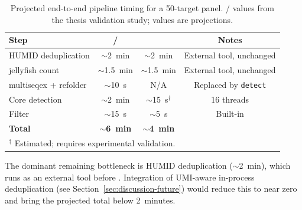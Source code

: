\begin{table}[h]
  \centering
  \caption{Projected end-to-end pipeline timing for a 50-target panel.
    \km{}/\kmtools{} values from the thesis validation study;
    \kmerdet{} values are projections. }
  \label{tab:e2e-timing}
  \begin{tabular}{lccc}
    \toprule
    Step & \km{}/\kmtools{} & \kmerdet{} & Notes \\
    \midrule
    HUMID deduplication & $\sim$2~min & $\sim$2~min & External tool, unchanged \\
    jellyfish count & $\sim$1.5~min & $\sim$1.5~min & External tool, unchanged \\
    multiseqex + refolder & $\sim$10~s & N/A & Replaced by \texttt{detect} \\
    Core detection & $\sim$2~min & $\sim$15~s$^\dagger$ & 16 threads \\
    Filter & $\sim$15~s & $\sim$5~s & Built-in \\
    \textbf{Total} & $\sim$\textbf{6~min} & $\sim$\textbf{4~min} & \\
    \bottomrule
    \multicolumn{4}{l}{\footnotesize $^\dagger$ Estimated; requires experimental validation.}
  \end{tabular}
\end{table}

The dominant remaining bottleneck is HUMID deduplication ($\sim$2~min), which
runs as an external tool before \kmerdet{}.  Integration of UMI-aware in-process
deduplication (see Section~\ref{sec:discussion-future}) would reduce this to
near zero and bring the projected total below 2~minutes.
